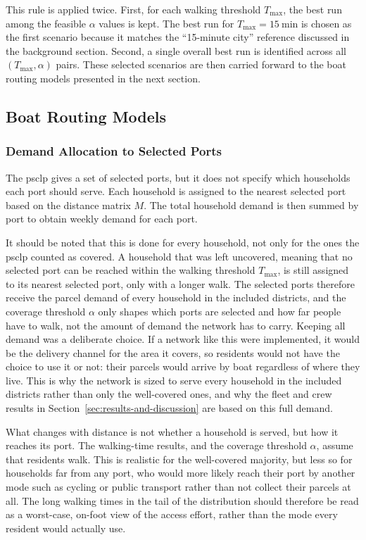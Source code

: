 \documentclass[12pt]{article}
\begin{document}
This rule is applied twice. First, for each walking threshold \(T_{\max}\), the best run among the feasible \(\alpha\) values is kept. The best run for \(T_{\max} = \qty{15}{\minute}\) is chosen as the first scenario because it matches the ``15-minute city'' reference discussed in the background section. Second, a single overall best run is identified across all \((T_{\max}, \alpha)\) pairs. These selected scenarios are then carried forward to the boat routing models presented in the next section.

\subsection{Boat Routing Models}
\label{subsec:boat-routing-models}

\subsubsection{Demand Allocation to Selected Ports}
\label{subsubsec:demand-allocation-to-selected-ports}

The \ac{psclp} gives a set of selected ports, but it does not specify which households each port should serve. Each household is assigned to the nearest selected port based on the distance matrix \(M\). The total household demand is then summed by port to obtain weekly demand for each port.

It should be noted that this is done for every household, not only for the ones the \ac{psclp} counted as covered. A household that was left uncovered, meaning that no selected port can be reached within the walking threshold \(T_{\max}\), is still assigned to its nearest selected port, only with a longer walk. The selected ports therefore receive the parcel demand of every household in the included districts, and the coverage threshold \(\alpha\) only shapes which ports are selected and how far people have to walk, not the amount of demand the network has to carry. Keeping all demand was a deliberate choice. If a network like this were implemented, it would be the delivery channel for the area it covers, so residents would not have the choice to use it or not: their parcels would arrive by boat regardless of where they live. This is why the network is sized to serve every household in the included districts rather than only the well-covered ones, and why the fleet and crew results in Section~\ref{sec:results-and-discussion} are based on this full demand.

What changes with distance is not whether a household is served, but how it reaches its port. The walking-time results, and the coverage threshold \(\alpha\), assume that residents walk. This is realistic for the well-covered majority, but less so for households far from any port, who would more likely reach their port by another mode such as cycling or public transport rather than not collect their parcels at all. The long walking times in the tail of the distribution should therefore be read as a worst-case, on-foot view of the access effort, rather than the mode every resident would actually use.
\end{document}
